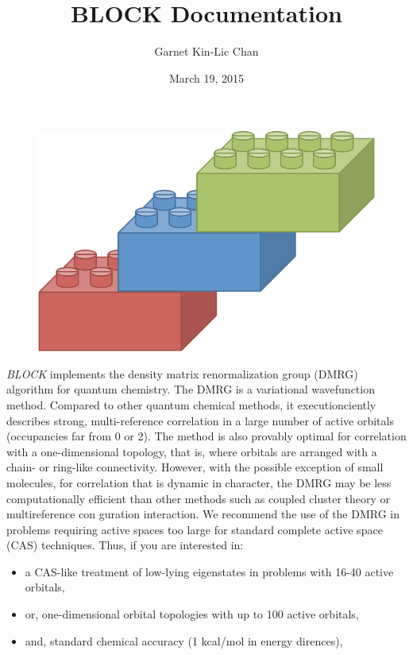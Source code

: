 \documentclass[letterpaper,10pt,english]{sphinxmanual}
\title{BLOCK Documentation}
\date{March 19, 2015}
\author{Garnet Kin-Lic Chan}
\begin{document}
\maketitle
\tableofcontents
{}\label{index::doc}

\begin{figure}[htbp]\begin{flushleft}

\includegraphics{block_logo.jpg}
\end{flushleft}\end{figure}

\emph{BLOCK} implements the density matrix renormalization group (DMRG) algorithm for quantum chemistry.
The DMRG is a variational wavefunction method. Compared to other quantum chemical methods,
it executionciently describes strong, multi-reference correlation in a large number of active orbitals (occupancies far from 0 or 2).
The method is also provably optimal for correlation with a one-dimensional topology, that is,
where orbitals are arranged with a chain- or ring-like connectivity.
However, with the possible exception of small molecules, for correlation that is dynamic in character,
the DMRG may be less computationally efficient than other methods
such as coupled cluster theory or multireference con guration interaction.
We recommend the use of the DMRG in problems requiring active spaces too large for
standard complete active space (CAS) techniques. Thus, if you are interested in:
\begin{itemize}
\item {} 
a CAS-like treatment of low-lying eigenstates in problems with 16-40 active orbitals,

\item {} 
or, one-dimensional orbital topologies with up to 100 active orbitals,

\item {} 
and, standard chemical accuracy (1 kcal/mol in energy dirences),

\end{itemize}
\end{document}
